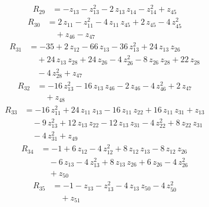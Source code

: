 \begin{equation*}\begin{aligned}
R_{29}&=-z_{13} -z_{13}^{2} -2\,z_{13}\,z_{14} -z_{14}^{2} +z_{45}
\end{aligned}\end{equation*}
\begin{equation*}\begin{aligned}
R_{30}&=2\,z_{11} -z_{11}^{2} -4\,z_{11}\,z_{45} +2\,z_{45} -4\,z_{45}^{2} \\
&\quad +z_{46} -z_{47}
\end{aligned}\end{equation*}
\begin{equation*}\begin{aligned}
R_{31}&=-35 +2\,z_{12} -66\,z_{13} -36\,z_{13}^{2} +24\,z_{13}\,z_{26} \\
&\quad +24\,z_{13}\,z_{28} +24\,z_{26} -4\,z_{26}^{2} -8\,z_{26}\,z_{28} +22\,z_{28} \\
&\quad -4\,z_{28}^{2} +z_{47}
\end{aligned}\end{equation*}
\begin{equation*}\begin{aligned}
R_{32}&=-16\,z_{13}^{2} -16\,z_{13}\,z_{46} -2\,z_{46} -4\,z_{46}^{2} +2\,z_{47} \\
&\quad +z_{48}
\end{aligned}\end{equation*}
\begin{equation*}\begin{aligned}
R_{33}&=-16\,z_{11}^{2} +24\,z_{11}\,z_{13} -16\,z_{11}\,z_{22} +16\,z_{11}\,z_{31} +z_{13} \\
&\quad -9\,z_{13}^{2} +12\,z_{13}\,z_{22} -12\,z_{13}\,z_{31} -4\,z_{22}^{2} +8\,z_{22}\,z_{31} \\
&\quad -4\,z_{31}^{2} +z_{49}
\end{aligned}\end{equation*}
\begin{equation*}\begin{aligned}
R_{34}&=-1 +6\,z_{12} -4\,z_{12}^{2} +8\,z_{12}\,z_{13} -8\,z_{12}\,z_{26} \\
&\quad -6\,z_{13} -4\,z_{13}^{2} +8\,z_{13}\,z_{26} +6\,z_{26} -4\,z_{26}^{2} \\
&\quad +z_{50}
\end{aligned}\end{equation*}
\begin{equation*}\begin{aligned}
R_{35}&=-1 -z_{13} -z_{13}^{2} -4\,z_{13}\,z_{50} -4\,z_{50}^{2} \\
&\quad +z_{51}
\end{aligned}\end{equation*}
